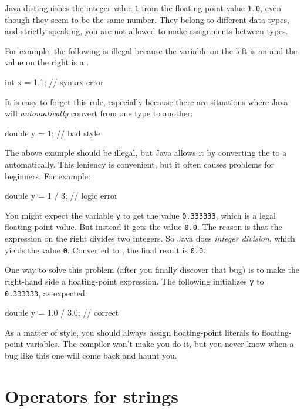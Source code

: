 Java distinguishes the integer value {\tt 1} from the floating-point value {\tt 1.0}, even though they seem to be the same number.
They belong to different data types, and strictly speaking, you are not allowed to make assignments between types.

For example, the following is illegal because the variable on the left is an  and the value on the right is a .

\begin{code}
    int x = 1.1;  // syntax error
\end{code}

It is easy to forget this rule, especially because there are situations where Java will {\em automatically} convert from one type to another:

\begin{code}
    double y = 1;  // bad style
\end{code}

The above example should be illegal, but Java allows it by converting the  to a  automatically.
This leniency is convenient, but it often causes problems for beginners. For example:

\begin{code}
    double y = 1 / 3;  // logic error
\end{code}


You might expect the variable {\tt y} to get the value {\tt 0.333333}, which is a legal floating-point value.
But instead it gets the value {\tt 0.0}.
The reason is that the expression on the right divides two integers.
So Java does {\em integer division}, which yields the value {\tt 0}.
Converted to , the final result is {\tt 0.0}.

One way to solve this problem (after you finally discover that bug) is to make the right-hand side a floating-point expression.
The following initializes {\tt y} to {\tt 0.333333}, as expected:

\begin{code}
    double y = 1.0 / 3.0;  // correct
\end{code}

As a matter of style, you should always assign floating-point literals to floating-point variables.
The compiler won't make you do it, but you never know when a bug like this one will come back and haunt you.


\section{Operators for strings}

